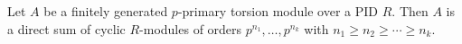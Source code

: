 Let $A$ be a finitely generated $p$-primary torsion module over a PID $R$. Then $A$ is a direct sum of cyclic $R$-modules of orders $p^{n_1}, \ldots, p^{n_k}$ with $n_1 \geq n_2 \geq \cdots \geq n_k$.
